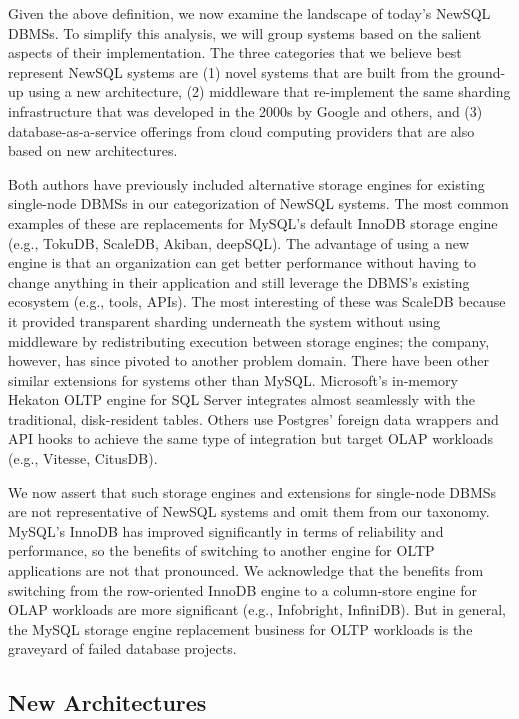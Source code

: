 \documentclass[a4paper,11pt,twoside,openright]{article}
\begin{document}
Given the above definition, we now examine the landscape of today's
NewSQL DBMSs. To simplify this analysis, we will group systems based on
the salient aspects of their implementation. The three categories that
we believe best represent NewSQL systems are (1) novel systems that are
built from the ground-up using a new architecture, (2) middleware that
re-implement the same sharding infrastructure that was developed in the
2000s by Google and others, and (3) database-as-a-service offerings from
cloud computing providers that are also based on new architectures.

Both authors have previously included alternative storage engines for
existing single-node DBMSs in our categorization of NewSQL systems. The
most common examples of these are replacements for MySQL's default
InnoDB storage engine (e.g., TokuDB, ScaleDB, Akiban, deepSQL). The
advantage of using a new engine is that an organization can get better
performance without having to change anything in their application and
still leverage the DBMS's existing ecosystem (e.g., tools, APIs). The
most interesting of these was ScaleDB because it provided transparent
sharding underneath the system without using middleware by
redistributing execution between storage engines; the company, however,
has since pivoted to another problem domain. There have been other
similar extensions for systems other than MySQL. Microsoft's in-memory
Hekaton OLTP engine for SQL Server integrates almost seamlessly with the
traditional, disk-resident tables. Others use Postgres' foreign data
wrappers and API hooks to achieve the same type of integration but
target OLAP workloads (e.g., Vitesse, CitusDB).

We now assert that such storage engines and extensions for single-node
DBMSs are not representative of NewSQL systems and omit them from our
taxonomy. MySQL's InnoDB has improved significantly in terms of
reliability and performance, so the benefits of switching to another
engine for OLTP applications are not that pronounced. We acknowledge
that the benefits from switching from the row-oriented InnoDB engine to
a column-store engine for OLAP workloads are more significant (e.g.,
Infobright, InfiniDB). But in general, the MySQL storage engine
replacement business for OLTP workloads is the graveyard of failed
database projects.

\hypertarget{new-architectures}{%
\subsection{New Architectures}\label{new-architectures}}
\end{document}
